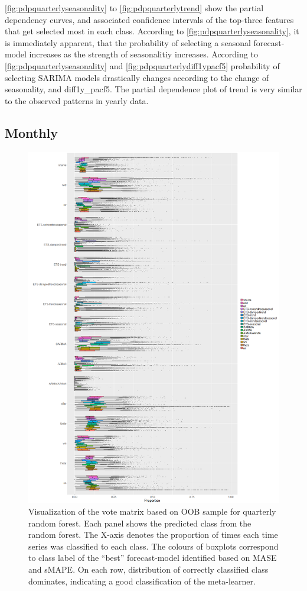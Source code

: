 \documentclass[11pt,a4paper,]{article}
\begin{document}
\autoref{fig:pdpquarterlyseasonality} to \autoref{fig:pdpquarterlytrend}
show the partial dependency curves, and associated confidence intervals
of the top-three features that get selected most in each class.
According to \autoref{fig:pdpquarterlyseasonality}, it is immediately
apparent, that the probability of selecting a seasonal forecast-model
increases as the strength of seasonalitiy increases. According to
\autoref{fig:pdpquarterlyseasonality} and
\autoref{fig:pdpquarterlydiff1ypacf5} probability of selecting SARIMA
models drastically changes according to the change of seasonality, and
diff1y\_pacf5. The partial dependence plot of trend is very similar to
the observed patterns in yearly data.

\subsection{Monthly}\label{monthly}

\begin{figure}
\centering
\includegraphics{figures/oobmonthly-1.png}
\caption{\label{fig:oobmonthly}Visualization of the vote matrix based on OOB
sample for quarterly random forest. Each panel shows the predicted class
from the random forest. The X-axis denotes the proportion of times each
time series was classified to each class. The colours of boxplots
correspond to class label of the ``best'' forecast-model identified
based on MASE and sMAPE. On each row, distribution of correctly
classified class dominates, indicating a good classification of the
meta-learner.}
\end{figure}
\end{document}
